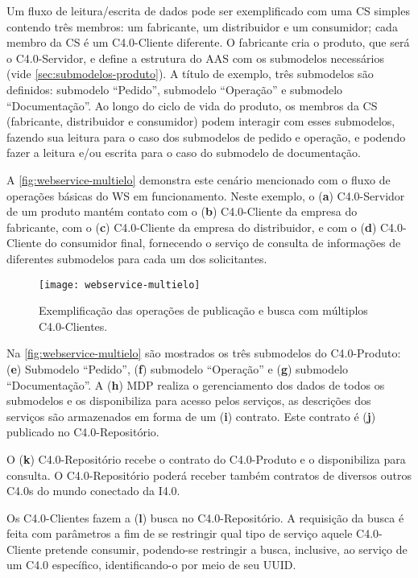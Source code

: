 Um fluxo de leitura/escrita de dados pode ser exemplificado com uma CS simples contendo três membros: um fabricante, um distribuidor e um consumidor; cada membro da CS é um C4.0-Cliente diferente. O fabricante cria o produto, que será o C4.0-Servidor, e define a estrutura do AAS com os submodelos necessários (vide \autoref{sec:submodelos-produto}). A título de exemplo, três submodelos são definidos: submodelo ``Pedido'', submodelo ``Operação'' e submodelo ``Documentação''. Ao longo do ciclo de vida do produto, os membros da CS (fabricante, distribuidor e consumidor) podem interagir com esses submodelos, fazendo sua leitura para o caso dos submodelos de pedido e operação, e podendo fazer a leitura e/ou escrita para o caso do submodelo de documentação.

A \autoref{fig:webservice-multielo} demonstra este cenário mencionado com o fluxo de operações básicas do WS em funcionamento. Neste exemplo, o (\textbf{a}) C4.0-Servidor de um produto mantém contato com o (\textbf{b}) C4.0-Cliente da empresa do fabricante, com o (\textbf{c}) C4.0-Cliente da empresa do distribuidor, e com o (\textbf{d}) C4.0-Cliente do consumidor final, fornecendo o serviço de consulta de informações de diferentes submodelos para cada um dos solicitantes.

\begin{figure}[t]
	\centering
	\texttt{[image: webservice-multielo]}
	\caption{Exemplificação das operações de publicação e busca com múltiplos C4.0-Clientes.}
	\label{fig:webservice-multielo}
\end{figure}

Na \autoref{fig:webservice-multielo} são mostrados os três submodelos do C4.0-Produto: (\textbf{e}) Submodelo ``Pedido'', (\textbf{f}) submodelo ``Operação'' e (\textbf{g}) submodelo ``Documentação''. A (\textbf{h}) MDP realiza o gerenciamento dos dados de todos os submodelos e os disponibiliza para acesso pelos serviços, as descrições dos serviços são armazenados em forma de um (\textbf{i}) contrato. Este contrato é (\textbf{j}) publicado no C4.0-Repositório.

O (\textbf{k}) C4.0-Repositório recebe o contrato do C4.0-Produto e o disponibiliza para consulta. O C4.0-Repositório poderá receber também contratos de diversos outros C4.0s do mundo conectado da I4.0.

Os C4.0-Clientes fazem a (\textbf{l}) busca no C4.0-Repositório. A requisição da busca é feita com parâmetros a fim de se restringir qual tipo de serviço aquele C4.0-Cliente pretende consumir, podendo-se restringir a busca, inclusive, ao serviço de um C4.0 específico, identificando-o por meio de seu UUID.

